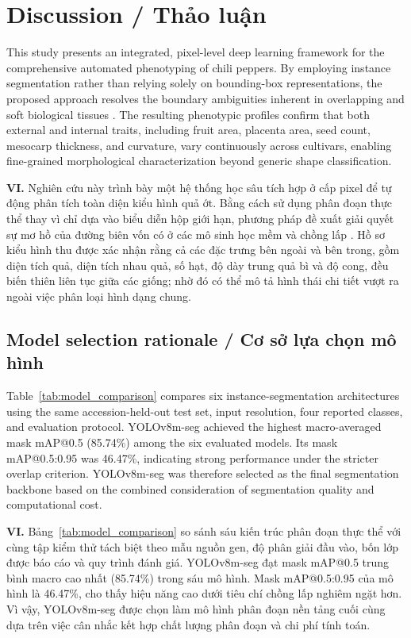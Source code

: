 \documentclass[final,1p,11pt,longtitle]{elsarticle}
\newenvironment{viet}{\par\smallskip\begingroup\color{viColor}\noindent\textbf{VI. }\ignorespaces}{\par\endgroup\smallskip}
\begin{document}
\section{Discussion / {\color{viColor} Thảo luận}}

This study presents an integrated, pixel-level deep learning framework for the comprehensive automated phenotyping of chili peppers. By employing instance segmentation rather than relying solely on bounding-box representations, the proposed approach resolves the boundary ambiguities inherent in overlapping and soft biological tissues \cite{robotic,instance}. The resulting phenotypic profiles confirm that both external and internal traits, including fruit area, placenta area, seed count, mesocarp thickness, and curvature, vary continuously across cultivars, enabling fine-grained morphological characterization beyond generic shape classification.

\begin{viet}
Nghiên cứu này trình bày một hệ thống học sâu tích hợp ở cấp pixel để tự động phân tích toàn diện kiểu hình quả ớt. Bằng cách sử dụng phân đoạn thực thể thay vì chỉ dựa vào biểu diễn hộp giới hạn, phương pháp đề xuất giải quyết sự mơ hồ của đường biên vốn có ở các mô sinh học mềm và chồng lấp \cite{robotic,instance}. Hồ sơ kiểu hình thu được xác nhận rằng cả các đặc trưng bên ngoài và bên trong, gồm diện tích quả, diện tích nhau quả, số hạt, độ dày trung quả bì và độ cong, đều biến thiên liên tục giữa các giống; nhờ đó có thể mô tả hình thái chi tiết vượt ra ngoài việc phân loại hình dạng chung.
\end{viet}


\subsection*{Model selection rationale / {\color{viColor} Cơ sở lựa chọn mô hình}}
Table~\ref{tab:model_comparison} compares six instance-segmentation architectures using the same accession-held-out test set, input resolution, four reported classes, and evaluation protocol. YOLOv8m-seg achieved the highest macro-averaged mask mAP@0.5 (85.74\%) among the six evaluated models. Its mask mAP@0.5:0.95 was 46.47\%, indicating strong performance under the stricter overlap criterion. YOLOv8m-seg was therefore selected as the final segmentation backbone based on the combined consideration of segmentation quality and computational cost.

\begin{viet}
Bảng~\ref{tab:model_comparison} so sánh sáu kiến trúc phân đoạn thực thể với cùng tập kiểm thử tách biệt theo mẫu nguồn gen, độ phân giải đầu vào, bốn lớp được báo cáo và quy trình đánh giá. YOLOv8m-seg đạt mask mAP@0.5 trung bình macro cao nhất (85.74\%) trong sáu mô hình. Mask mAP@0.5:0.95 của mô hình là 46.47\%, cho thấy hiệu năng cao dưới tiêu chí chồng lấp nghiêm ngặt hơn. Vì vậy, YOLOv8m-seg được chọn làm mô hình phân đoạn nền tảng cuối cùng dựa trên việc cân nhắc kết hợp chất lượng phân đoạn và chi phí tính toán.
\end{viet}
\end{document}
